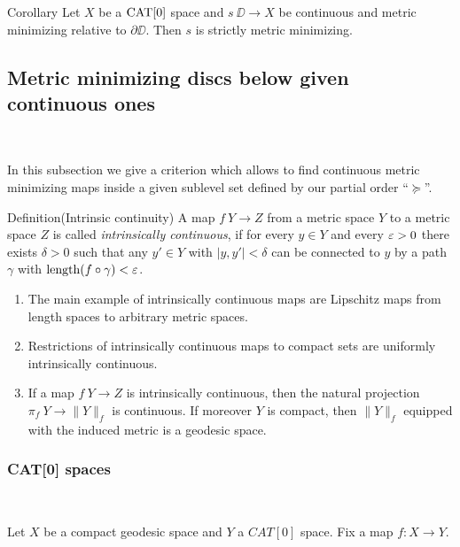 \documentclass[a4paper,10pt]{amsart}
\begin{document}
\begin{thm}{Corollary}\label{cor:strict-mm}
Let  $X$ be a $\mathop{\rm CAT}\nolimits[0]$ space and $s\:\DD\to X$ be continuous and metric minimizing relative to $\partial\DD$. 
Then $s$ is strictly metric minimizing.
\end{thm}



\subsection{Metric minimizing discs below given continuous ones}~

In this subsection we give a criterion which allows to 
find continuous metric minimizing maps inside a given sublevel set defined by our partial order ``$\succcurlyeq$''.

\begin{thm}{Definition}(Intrinsic continuity)
A map $f\:Y\to Z$ from a metric space $Y$ to a metric space
 $Z$ is called
{\em intrinsically continuous}, if for every $y\in Y$ 
and every $\varepsilon>0$ there
exists $\delta>0$ such that any  $y'\in Y$
with $|y,y'|<\delta$ can be connected to $y$ by a path $\gamma$ 
with $\mathop{\rm length}\nolimits(f\circ\gamma)<\varepsilon$.
\end{thm}

\begin{enumerate}
 \item The main example of intrinsically continuous maps are Lipschitz
maps from length spaces to arbitrary metric spaces.
\item Restrictions of intrinsically continuous maps to compact sets are uniformly intrinsically continuous. 
\item If a map $f\:Y\to Z$ is intrinsically continuous, then 
the natural projection $\pi_f\:Y\rightarrow \|Y\|_f$ is continuous. If
moreover $Y$ is compact, then $\|Y\|_f$ equipped with the induced 
metric is a geodesic space.
\end{enumerate}



\subsubsection{CAT[0] spaces}~

\medskip

Let $X$ be a compact geodesic space and $Y$ a $CAT[0]$ space. Fix a map  
$f:X\to Y$.
\end{document}
